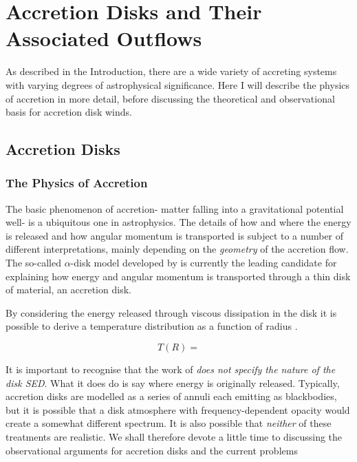 \chapter{Accretion Disks and Their Associated Outflows}


As described in the Introduction, there are a wide variety of accreting systems
with varying degrees of astrophysical significance. Here I will describe the 
physics of accretion in more detail, before discussing the theoretical and observational 
basis for accretion disk winds. 



\section{Accretion Disks}

\subsection{The Physics of Accretion}

The basic phenomenon of accretion- matter falling into a gravitational potential well- 
is a ubiquitous one in astrophysics. The details of how and where the energy is released
and how angular momentum is transported is subject to a number of different 
interpretations, mainly depending on the {\em geometry} of the accretion flow.
The so-called $\alpha$-disk model developed by \cite{shakurasunyaev1973} is
currently the leading candidate for explaining how energy and angular momentum
is transported through a thin disk of material, an accretion disk.

By considering the energy released through viscous dissipation 
in the disk it is possible to derive a temperature distribution as a function of 
radius \citep{shakurasunyaev1973, fkrbook}. 

\begin{equation}
T(R) =  
\end{equation}

It is important to recognise that the work of \cite{shakurasunyaev1973} 
{\sl does not specify the nature of the disk SED}. What it does do is 
say where energy is originally released. Typically,
accretion disks are modelled as a series of annuli each emitting 
as blackbodies, but it is possible that a disk atmosphere with frequency-dependent
opacity would create a somewhat different spectrum. It is also possible that {\em neither} of these 
treatments are realistic. We shall therefore devote a little time to discussing
the observational arguments for accretion disks and the current problems 


